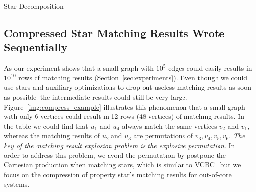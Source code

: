 \begin{algorithm}[ht]
  \caption{Star Decomposition}\label{alg:decompose_stars}
\end{algorithm}
\subsection{Compressed Star Matching Results Wrote Sequentially}\label{sec:match_compress}
As our experiment shows that a small graph with $10^5$ edges could easily results in $10^{10}$ rows of matching results (Section~\ref{sec:experiments}).
Even though we could use stars and auxiliary optimizations to drop out useless matching results as soon as possible, the intermediate results could still be very large.
Figure~\ref{img:compress_example} illustrates this phenomenon that a small graph with only 6 vertices could result in 12 rows (48 vertices) of matching results.
In the table we could find that $u_1$ and $u_4$ always match the same vertices $v_2$ and $v_1$,
whereas the matching results of $u_2$ and $u_3$ are permutations of $v_3, v_4, v_5, v_6$.
\emph{The key of the matching result explosion problem is the explosive permutation}.
In order to address this problem, we avoid the permutation by postpone the Cartesian production when matching stars, which is similar to VCBC~\cite{DBLP:journals/pvldb/QiaoZC17} but we focus on the compression of property star's matching results for out-of-core systems.

